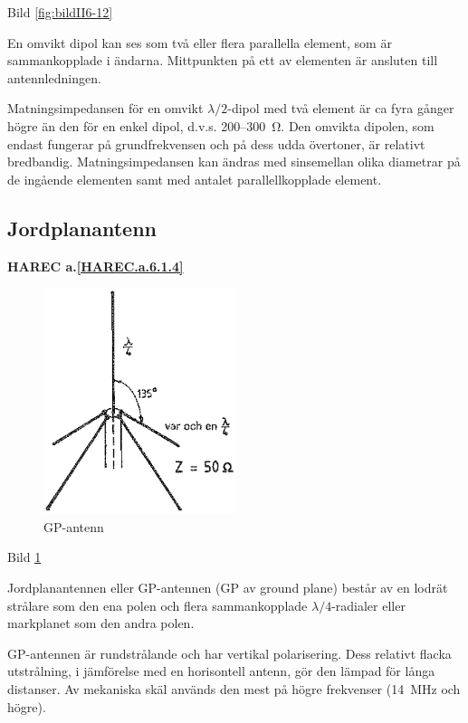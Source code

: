 Bild \ref{fig:bildII6-12}

En omvikt dipol kan ses som två eller flera parallella element, som är
sammankopplade i ändarna. Mittpunkten på ett av elementen är ansluten
till antennledningen.

Matningsimpedansen för en omvikt \(\lambda/2\)-dipol med två element är
ca fyra gånger högre än den för en enkel dipol, d.v.s. 200--300~Ω.
Den omvikta dipolen, som endast fungerar på grundfrekvensen och på
dess udda övertoner, är relativt bredbandig. Matningsimpedansen kan
ändras med sinsemellan olika diametrar på de ingående elementen samt
med antalet parallellkopplade element.

\subsection{Jordplanantenn}
\textbf{
HAREC a.\ref{HAREC.a.6.1.4}\label{myHAREC.a.6.1.4}
}

\begin{figure}
  \includegraphics[width=0.5\textwidth]{images/bild_2_6-13.png}
  \caption{GP-antenn}
  \label{fig:bildII6-13}
\end{figure}

Bild \ref{fig:bildII6-13}

Jordplanantennen eller GP-antennen (GP av ground plane) består av en
lodrät strålare som den ena polen och flera sammankopplade
\(\lambda/4\)-radialer eller markplanet som den andra polen.

GP-antennen är rundstrålande och har vertikal polarisering. Dess
relativt flacka utstrålning, i jämförelse med en horisontell antenn,
gör den lämpad för långa distanser. Av mekaniska skäl används den
mest på högre frekvenser (14~MHz och högre).

